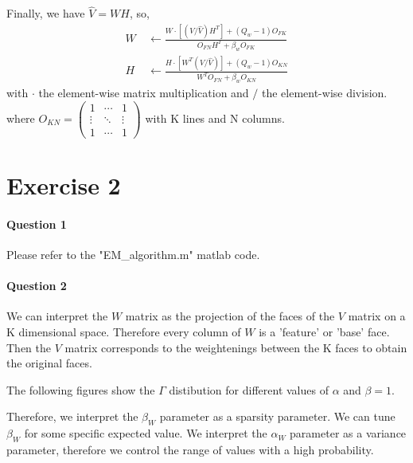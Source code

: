 \documentclass[a4paper,12pt]{article} %
\begin{document}
Finally, we have $\hat{V}=WH$, so,
\begin{align*}W\: &\leftarrow\frac{W\cdot[(V/\hat{V})H^T]+(Q_w-1)O_{FK}}{O_{FN}H^T+\beta_wO_{FK}}\\
H\: &\leftarrow\frac{H\cdot[W^T(V/\hat{V})]+(Q_w-1)O_{KN}}{W^TO_{FN}+\beta_wO_{KN}}
\end{align*}
with $\cdot$ the element-wise matrix multiplication and $/$ the element-wise division.  \\
where $O_{KN}=\left( 
\begin{array}{ccc} 
1&\cdots&1\\
\vdots&\ddots&\vdots\\
1& \cdots &1 
\end{array}
\right)$
with K lines and N columns.

\section{Exercise 2}
\paragraph{Question 1}
Please refer to the "EM\_algorithm.m" matlab code. \\

\paragraph{Question 2}

We can interpret the $W$ matrix as the projection of the faces of the $V$ matrix on a K dimensional space. Therefore every column of $W$ is a 'feature' or 'base' face. Then the $V$ matrix corresponds to the weightenings between the K faces to obtain the original faces.

The following figures show the $\Gamma$ distibution for different values of $\alpha$ and $\beta = 1$.

Therefore, we interpret the $\beta_W$ parameter as a sparsity parameter. We can tune $\beta_W$ for some specific expected value. We interpret the $\alpha_W$ parameter as a variance parameter, therefore we control the range of values with a high probability.
\end{document}
